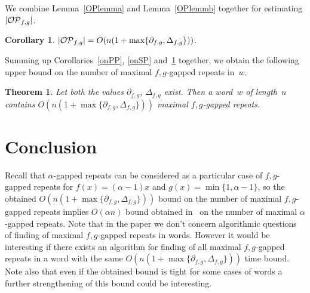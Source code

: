 \documentclass{article}
\newtheorem{theorem}{Theorem}
\newtheorem{corollary}{Corollary}
\begin{document}
We combine Lemma~\ref{OPlemma} and Lemma~\ref{OPlemmb} together for estimating $|{\cal OP}_{f, g}|$.
\begin{corollary}
$|{\cal OP}_{f, g}|=O(n(1+\max\{\partial_{f, g}, \Delta_{f, g}\}))$.
\label{OPcorr}
\end{corollary}

Summing up Corollaries~\ref{onPP}, \ref{onSP} and~\ref{OPcorr} together, we obtain the following
upper bound on the number of maximal $f,g$-gapped repeats in~$w$.
\begin{theorem}
Let both the values $\partial_{f, g}$, $\Delta_{f, g}$ exist. Then a word~$w$ of length~$n$
contains $O(n(1+\max\{\partial_{f, g}, \Delta_{f, g}\}))$ maximal $f,g$-gapped repeats.
\label{repsbound}
\end{theorem}

\section{Conclusion}

Recall that $\alpha$-gapped repeats can be considered as a particular case of $f,g$-gapped 
repeats for $f(x)=(\alpha -1)x$ and $g(x)=\min \{1, \alpha -1\}$, so the obtained 
$O(n(1+\max\{\partial_{f, g}, \Delta_{f, g}\}))$ bound on the number of maximal $f,g$-gapped 
repeats implies $O(\alpha n)$ bound obtained in~\cite{LATA16} on the number of maximal 
$\alpha$-gapped repeats. Note that in the paper we don't concern algorithmic questions of
finding of maximal $f,g$-gapped repeats in words. However it would be interesting if there exists
an algorithm for finding of all maximal $f,g$-gapped repeats in a word with the same 
$O(n(1+\max\{\partial_{f, g}, \Delta_{f, g}\}))$ time bound. Note also that even if
the obtained bound is tight for some cases of words a further strengthening of this bound
could be interesting.
\end{document}
